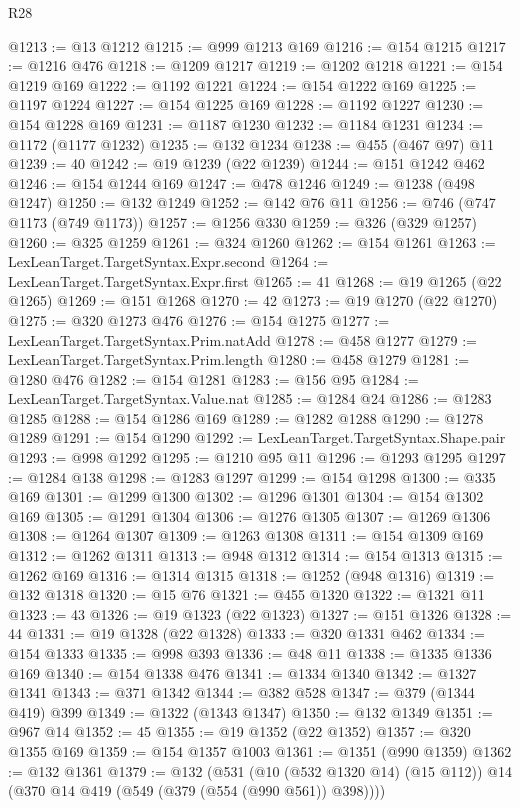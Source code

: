 \begin{lexlean}{R28}
\begin{coremodule}
@1213 := @13 @1212
@1215 := @999 @1213 @169
@1216 := @154 @1215
@1217 := @1216 @476
@1218 := @1209 @1217
@1219 := @1202 @1218
@1221 := @154 @1219 @169
@1222 := @1192 @1221
@1224 := @154 @1222 @169
@1225 := @1197 @1224
@1227 := @154 @1225 @169
@1228 := @1192 @1227
@1230 := @154 @1228 @169
@1231 := @1187 @1230
@1232 := @1184 @1231
@1234 := @1172 (@1177 @1232)
@1235 := @132 @1234
@1238 := @455 (@467 @97) @11
@1239 := 40
@1242 := @19 @1239 (@22 @1239)
@1244 := @151 @1242 @462
@1246 := @154 @1244 @169
@1247 := @478 @1246
@1249 := @1238 (@498 @1247)
@1250 := @132 @1249
@1252 := @142 @76 @11
@1256 := @746 (@747 @1173 (@749 @1173))
@1257 := @1256 @330
@1259 := @326 (@329 @1257)
@1260 := @325 @1259
@1261 := @324 @1260
@1262 := @154 @1261
@1263 := LexLeanTarget.TargetSyntax.Expr.second
@1264 := LexLeanTarget.TargetSyntax.Expr.first
@1265 := 41
@1268 := @19 @1265 (@22 @1265)
@1269 := @151 @1268
@1270 := 42
@1273 := @19 @1270 (@22 @1270)
@1275 := @320 @1273 @476
@1276 := @154 @1275
@1277 := LexLeanTarget.TargetSyntax.Prim.natAdd
@1278 := @458 @1277
@1279 := LexLeanTarget.TargetSyntax.Prim.length
@1280 := @458 @1279
@1281 := @1280 @476
@1282 := @154 @1281
@1283 := @156 @95
@1284 := LexLeanTarget.TargetSyntax.Value.nat
@1285 := @1284 @24
@1286 := @1283 @1285
@1288 := @154 @1286 @169
@1289 := @1282 @1288
@1290 := @1278 @1289
@1291 := @154 @1290
@1292 := LexLeanTarget.TargetSyntax.Shape.pair
@1293 := @998 @1292
@1295 := @1210 @95 @11
@1296 := @1293 @1295
@1297 := @1284 @138
@1298 := @1283 @1297
@1299 := @154 @1298
@1300 := @335 @169
@1301 := @1299 @1300
@1302 := @1296 @1301
@1304 := @154 @1302 @169
@1305 := @1291 @1304
@1306 := @1276 @1305
@1307 := @1269 @1306
@1308 := @1264 @1307
@1309 := @1263 @1308
@1311 := @154 @1309 @169
@1312 := @1262 @1311
@1313 := @948 @1312
@1314 := @154 @1313
@1315 := @1262 @169
@1316 := @1314 @1315
@1318 := @1252 (@948 @1316)
@1319 := @132 @1318
@1320 := @15 @76
@1321 := @455 @1320
@1322 := @1321 @11
@1323 := 43
@1326 := @19 @1323 (@22 @1323)
@1327 := @151 @1326
@1328 := 44
@1331 := @19 @1328 (@22 @1328)
@1333 := @320 @1331 @462
@1334 := @154 @1333
@1335 := @998 @393
@1336 := @48 @11
@1338 := @1335 @1336 @169
@1340 := @154 @1338 @476
@1341 := @1334 @1340
@1342 := @1327 @1341
@1343 := @371 @1342
@1344 := @382 @528
@1347 := @379 (@1344 @419) @399
@1349 := @1322 (@1343 @1347)
@1350 := @132 @1349
@1351 := @967 @14
@1352 := 45
@1355 := @19 @1352 (@22 @1352)
@1357 := @320 @1355 @169
@1359 := @154 @1357 @1003
@1361 := @1351 (@990 @1359)
@1362 := @132 @1361
@1379 := @132
    (@531
      (@10 (@532 @1320 @14) (@15 @112))
      @14
      (@370 @14 @419 (@549 (@379 (@554 (@990 @561)) @398))))

\end{coremodule}
\end{lexlean}
